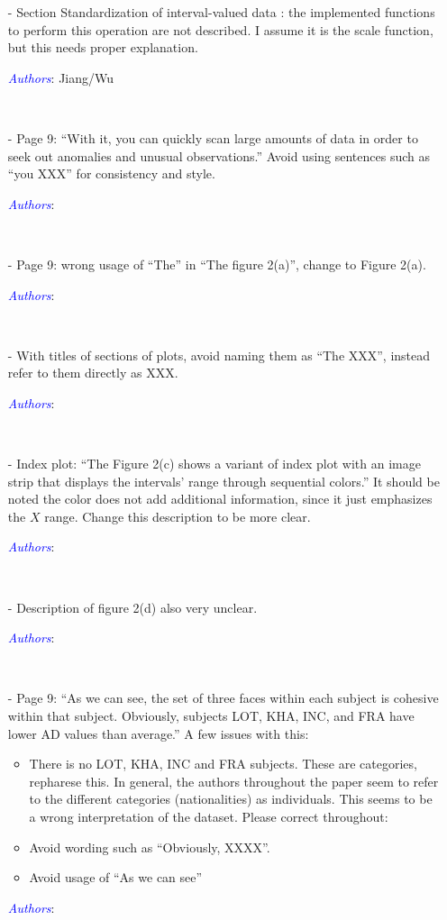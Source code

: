\documentclass[11pt]{article}
\newcommand{\authors}[1]{

 \parbox{15cm}{\textcolor{blue}{\it Authors}: \color{red}#1}
 \\ \vspace{0.3cm}
}
\begin{document}
\begin{itemize}
{}


\item[-] Section Standardization of interval-valued data : the implemented functions to perform this operation are not described. I assume it is the scale function, but this needs proper explanation. 
\authors{Jiang/Wu

}


\item[-] Page 9: “With it, you can quickly scan large amounts of data in order to seek out anomalies and unusual observations.” Avoid using sentences such as “you XXX” for consistency and style. 
\authors{

}


\item[-] Page 9: wrong usage of “The” in “The figure 2(a)”, change to Figure 2(a). 
\authors{

}


\item[-] With titles of sections of plots, avoid naming them as “The XXX”, instead refer to them directly as XXX. 
\authors{

}


\item[-] Index plot: “The Figure 2(c) shows a variant of index plot with an image strip that displays the intervals’ range through sequential colors.” It should be noted the color does not add additional information, since it just emphasizes the $X$ range. Change this description to be more clear. 
\authors{

}



\item[-] Description of figure 2(d) also very unclear. 
\authors{

}


\item[-] Page 9: “As we can see, the set of three faces within each subject is cohesive within that subject. Obviously, subjects LOT, KHA, INC, and FRA have lower AD values than average.” A few issues with this: 
\begin{itemize}
\item 	
There is no LOT, KHA, INC and FRA subjects. These are categories, repharese this. In general, the authors throughout the paper seem to refer to the different categories (nationalities) as individuals. This seems to be a wrong interpretation of the dataset. Please correct throughout: 
\item
Avoid wording such as “Obviously, XXXX”. 
\item
Avoid usage of “As we can see” 
\end{itemize}
\authors{

}
\end{itemize}
\end{document}
